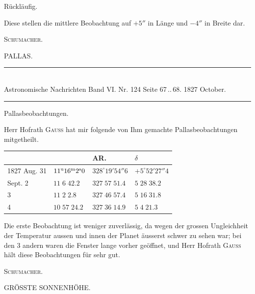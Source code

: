 Rückläufig.

Diese stellen die mittlere Beobachtung auf $+5''$ in Länge und $-4''$ in Breite dar.
\begin{flushright}\textsc{Schumacher.}\end{flushright}

\clearpage
{}
\hypertarget{native-465-pallas}{}
\begin{center}{\large PALLAS.}\end{center}

\begin{center}
\rule{0.55\linewidth}{0.4pt}\\[2pt]
Astronomische Nachrichten Band VI. Nr. 124 Seite 67\,..\,68. 1827 October.\\[2pt]
\rule{0.55\linewidth}{0.4pt}
\end{center}

\begin{center}Pallasbeobachtungen.\end{center}

Herr Hofrath \textsc{Gauss} hat mir folgende von Ihm gemachte Pallasbeobachtungen mitgetheilt.

\begin{center}
\begin{tabular}{l|l|l|l}
 & & AR. & $\delta$ \\
\hline
1827 Aug. 31 & $11^{\rm u}16^{\rm m}2^{\rm s}0$ & $328^\circ19'54''6$ & $+5^\circ52'27''4$ \\
\hfill Sept. 2 & $11\;6\;42.2$ & $327\;57\;51.4$ & $5\;28\;38.2$ \\
\hfill 3 & $11\;2\;2.8$ & $327\;46\;57.4$ & $5\;16\;31.8$ \\
\hfill 4 & $10\;57\;24.2$ & $327\;36\;14.9$ & $5\;4\;21.3$ \\
\end{tabular}
\end{center}

Die erste Beobachtung ist weniger zuverlässig, da wegen der grossen Ungleichheit der Temperatur aussen und innen der Planet äusserst schwer zu sehen war; bei den 3 andern waren die Fenster lange vorher geöffnet, und Herr Hofrath \textsc{Gauss} hält diese Beobachtungen für sehr gut.
\begin{flushright}\textsc{Schumacher.}\end{flushright}

\clearpage
{}
\hypertarget{native-465-sunheight}{}
\begin{center}{\large GRÖSSTE SONNENHÖHE.}\end{center}

